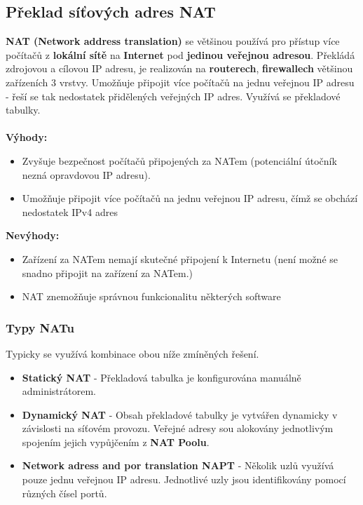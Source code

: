 \subsection*{Překlad síťových adres NAT}
\textbf{NAT (Network address translation)} se většinou používá pro přístup více počítačů z \textbf{lokální sítě} na \textbf{Internet} pod \textbf{jedinou veřejnou adresou}. Překládá zdrojovou a cílovou IP adresu, je realizován na \textbf{routerech}, \textbf{firewallech} většinou zařízeních 3 vrstvy. Umožňuje připojit více počítačů na jednu veřejnou IP adresu - řeší se tak nedostatek přidělených veřejných IP adres. Využívá se překladové tabulky. 
\\\\
\textbf{Výhody:} 
\begin{itemize}
	\item Zvyšuje bezpečnost počítačů připojených za NATem (potenciální útočník nezná opravdovou IP adresu). 
	\item Umožňuje připojit více počítačů na jednu veřejnou IP adresu, čímž se obchází nedostatek IPv4 adres
\end{itemize}
\textbf{Nevýhody:}
\begin{itemize}
	\item Zařízení za NATem nemají skutečné připojení k Internetu (není možné se snadno připojit na zařízení za NATem.)
	\item NAT znemožňuje správnou funkcionalitu některých software
\end{itemize}

\subsubsection*{Typy NATu}
Typicky se využívá kombinace obou níže zmíněných řešení.
\begin{itemize}
	\item \textbf{Statický NAT} - Překladová tabulka je konfigurována manuálně administrátorem.
	\item \textbf{Dynamický NAT} - Obsah překladové tabulky je vytvářen dynamicky v závislosti na síťovém provozu. Veřejné adresy sou alokovány jednotlivým spojením jejich vypůjčením z \textbf{NAT Poolu}.
	\item \textbf{Network adress and por translation NAPT} - Několik uzlů využívá pouze jednu veřejnou IP adresu. Jednotlivé uzly jsou identifikovány pomocí různých čísel portů.
\end{itemize}

